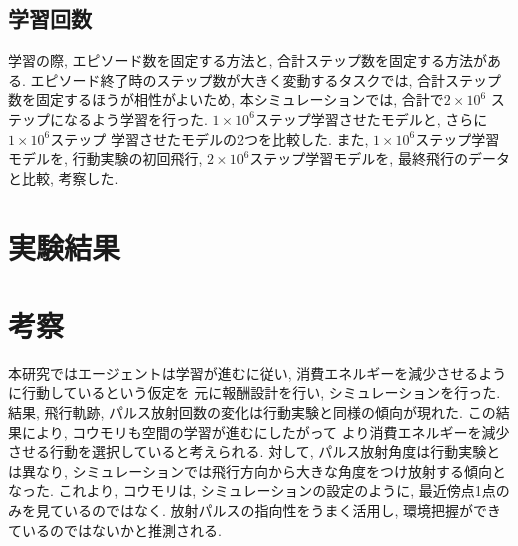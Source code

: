 \documentclass[../main]{subfiles}
\begin{document}
\subsection{学習回数}
学習の際, エピソード数を固定する方法と, 
合計ステップ数を固定する方法がある.
エピソード終了時のステップ数が大きく変動するタスクでは, 
合計ステップ数を固定するほうが相性がよいため, 
本シミュレーションでは, 合計で$2\times 10^6$
ステップになるよう学習を行った.
$1\times 10^6$ステップ学習させたモデルと, 
さらに$1\times 10^6$ステップ
学習させたモデルの2つを比較した.
また, $1\times 10^6$ステップ学習モデルを, 
行動実験の初回飛行, 
$2\times 10^6$ステップ学習モデルを, 
最終飛行のデータと比較, 考察した.


\section{実験結果}



\section{考察}
本研究ではエージェントは学習が進むに従い, 
消費エネルギーを減少させるように行動しているという仮定を
元に報酬設計を行い, シミュレーションを行った.
結果, 飛行軌跡, パルス放射回数の変化は行動実験と同様の傾向が現れた.
この結果により,
コウモリも空間の学習が進むにしたがって
より消費エネルギーを減少させる行動を選択していると考えられる.
対して, パルス放射角度は行動実験とは異なり, 
シミュレーションでは飛行方向から大きな角度をつけ放射する傾向となった.
これより, コウモリは, シミュレーションの設定のように, 
最近傍点1点のみを見ているのではなく.
放射パルスの指向性をうまく活用し, 
環境把握ができているのではないかと推測される.
\end{document}
